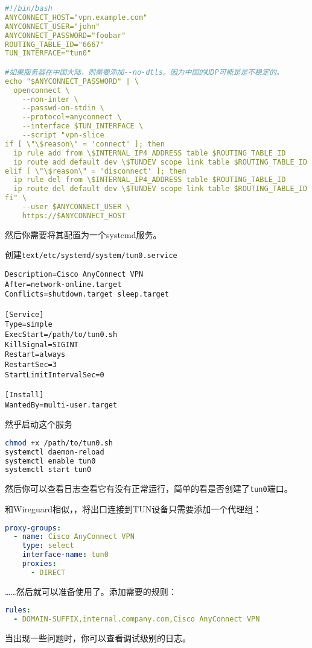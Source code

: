 \begin{lstlisting}[breaklines=true,language=yaml,style=yaml]
#!/bin/bash
ANYCONNECT_HOST="vpn.example.com"
ANYCONNECT_USER="john"
ANYCONNECT_PASSWORD="foobar"
ROUTING_TABLE_ID="6667"
TUN_INTERFACE="tun0"

#如果服务器在中国大陆，则需要添加--no-dtls。因为中国的UDP可能是是不稳定的。
echo "$ANYCONNECT_PASSWORD" | \
  openconnect \
    --non-inter \
    --passwd-on-stdin \
    --protocol=anyconnect \
    --interface $TUN_INTERFACE \
    --script "vpn-slice
if [ \"\$reason\" = 'connect' ]; then
  ip rule add from \$INTERNAL_IP4_ADDRESS table $ROUTING_TABLE_ID
  ip route add default dev \$TUNDEV scope link table $ROUTING_TABLE_ID
elif [ \"\$reason\" = 'disconnect' ]; then
  ip rule del from \$INTERNAL_IP4_ADDRESS table $ROUTING_TABLE_ID
  ip route del default dev \$TUNDEV scope link table $ROUTING_TABLE_ID
fi" \
    --user $ANYCONNECT_USER \
    https://$ANYCONNECT_HOST
\end{lstlisting}


然后你需要将其配置为一个systemd服务。

创建\verb|text/etc/systemd/system/tun0.service|

\begin{lstlisting}
Description=Cisco AnyConnect VPN
After=network-online.target
Conflicts=shutdown.target sleep.target

[Service]
Type=simple
ExecStart=/path/to/tun0.sh
KillSignal=SIGINT
Restart=always
RestartSec=3
StartLimitIntervalSec=0

[Install]
WantedBy=multi-user.target
\end{lstlisting}

然乎启动这个服务
\begin{lstlisting}[breaklines=true,language=sh]
chmod +x /path/to/tun0.sh
systemctl daemon-reload
systemctl enable tun0
systemctl start tun0
\end{lstlisting}

然后你可以查看日志查看它有没有正常运行，简单的看是否创建了\verb|tun0|端口。

和Wireguard相似，，将出口连接到TUN设备只需要添加一个代理组：

\begin{lstlisting}[breaklines=true,language=yaml,style=yaml]
proxy-groups:
  - name: Cisco AnyConnect VPN
    type: select
    interface-name: tun0
    proxies:
      - DIRECT
\end{lstlisting}

……然后就可以准备使用了。添加需要的规则：

\begin{lstlisting}[breaklines=true,language=yaml,style=yaml]
rules:
  - DOMAIN-SUFFIX,internal.company.com,Cisco AnyConnect VPN
\end{lstlisting}

当出现一些问题时，你可以查看调试级别的日志。